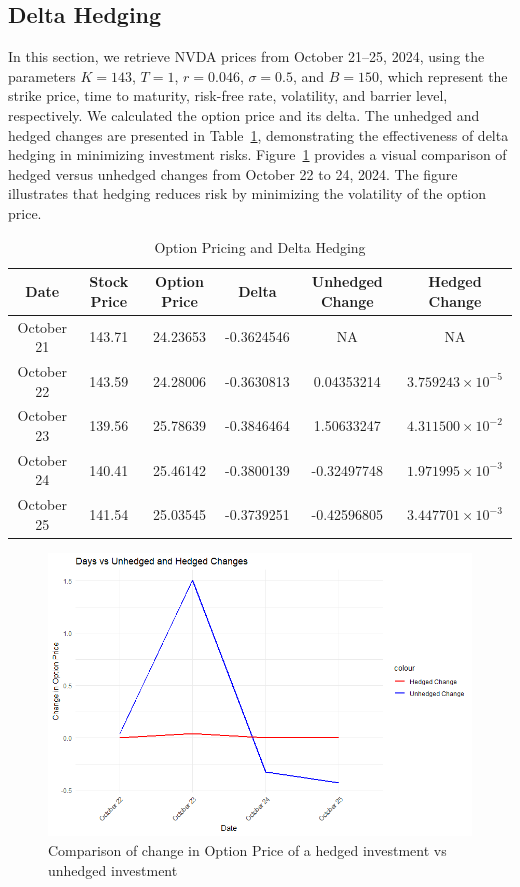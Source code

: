 \subsection{Delta Hedging}

In this section, we retrieve NVDA prices from October 21--25, 2024, using the parameters \( K = 143 \), \( T = 1 \), \( r = 0.046 \), \( \sigma = 0.5 \), and \( B = 150 \), which represent the strike price, time to maturity, risk-free rate, volatility, and barrier level, respectively. We calculated the option price and its delta. The unhedged and hedged changes are presented in Table~\ref{tab:hedging}, demonstrating the effectiveness of delta hedging in minimizing investment risks. Figure~\ref{fig:hedgingvunhedging} provides a visual comparison of hedged versus unhedged changes from October 22 to 24, 2024. The figure illustrates that hedging reduces risk by minimizing the volatility of the option price.

\begin{table}[h]
    \centering
    \caption{Option Pricing and Delta Hedging}
    \label{tab:hedging}
    \begin{tabular}{|c|c|c|c|c|c|}
        \hline
        \textbf{Date} & \textbf{Stock Price} & \textbf{Option Price} & \textbf{Delta} & \textbf{Unhedged Change} & \textbf{Hedged Change} \\
        \hline
        October 21 & 143.71 & 24.23653 & -0.3624546 & NA & NA \\
        \hline
        October 22 & 143.59 & 24.28006 & -0.3630813 & 0.04353214 & $3.759243 \times 10^{-5}$ \\
        \hline
        October 23 & 139.56 & 25.78639 & -0.3846464 & 1.50633247 & $4.311500 \times 10^{-2}$ \\
        \hline
        October 24 & 140.41 & 25.46142 & -0.3800139 & -0.32497748 & $1.971995 \times 10^{-3}$ \\
        \hline
        October 25 & 141.54 & 25.03545 & -0.3739251 & -0.42596805 & $3.447701 \times 10^{-3}$ \\
        \hline
    \end{tabular}
\end{table}

\begin{figure}[h]
    \centering
    \includegraphics[width=0.65\linewidth]{content/images/hedgedvsunhedged.png}
    \caption{Comparison of change in Option Price of a hedged investment vs unhedged investment}
    \label{fig:hedgingvunhedging}
\end{figure}

